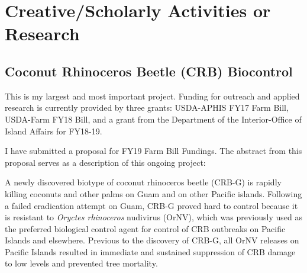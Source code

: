 \documentclass[12pt,english]{scrartcl}
\begin{document}
\begin{comment}

\raggedright\vspace{2mm}\textbf{Activity}
\begin{itemize}
\item On-line output \cite{moore2018onlinecatalog,moore2018textitcitripestis2,moore2018textitcitripestis,moore2018lobatelac2,moore2018scanuniversity,moore2017website,moore2018insectpin,moore2018checklist,moore2018citripestis,moore2018lobatelac,manuel2017pacific,moore2018inaturalist,moore2018interactive,moore2017listof,moore2017guamforestry,moore2017crbgarticlereview,moore2017crbtrap,moore2017techblog,moore2017scaevoladieback,moore2017failedattempt,moore2017publish,moore2017usingscrapy,moore2017tweeking,moore2017install,moore2017setting,moore2017usingthe,moore2017finding,moore2017usingscrapy2,moore2017calculate,moore2017converting,moore2017migrate,moore2018croppestlist}
\end{itemize}
\raggedright\vspace{2mm}\textbf{Reference(s)}

\begin{btSect}[vancouver]{zotero}
\btPrintCited
\end{btSect}
\newpage{}
\end{comment}

\pagebreak

\section{Creative/Scholarly Activities or Research}

\subsection{\label{sec:Coconut-Rhinoceros-Beetle}Coconut Rhinoceros Beetle (CRB)
Biocontrol}

This is my largest and most important project. Funding for outreach
and applied research is currently provided by three grants: USDA-APHIS
FY17 Farm Bill, USDA-Farm FY18 Bill, and a grant from the Department
of the Interior-Office of Island Affairs for FY18-19.

I have submitted a proposal for FY19 Farm Bill Fundings. The abstract
from this proposal serves as a description of this ongoing project:

A newly discovered biotype of coconut rhinoceros beetle (CRB-G) is
rapidly killing coconuts and other palms on Guam and on other Pacific
islands. Following a failed eradication attempt on Guam, CRB-G proved
hard to control because it is resistant to \emph{Oryctes rhinoceros}
nudivirus (OrNV), which was previously used as the preferred biological
control agent for control of CRB outbreaks on Pacific Islands and
elsewhere. Previous to the discovery of CRB-G, all OrNV releases on
Pacific Islands resulted in immediate and sustained suppression of
CRB damage to low levels and prevented tree mortality.
\end{document}
